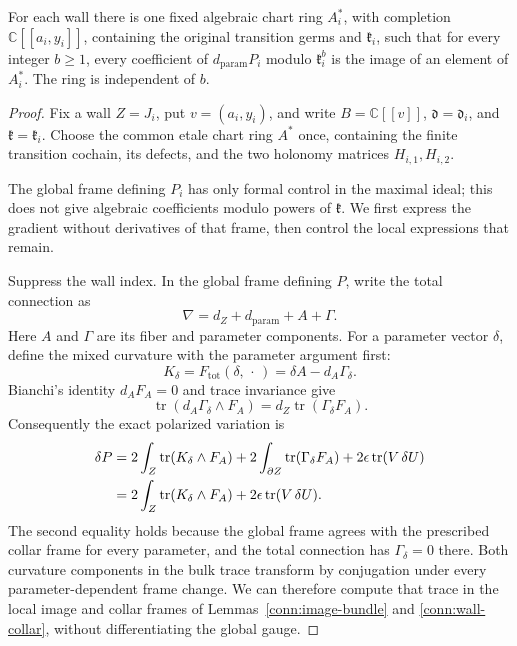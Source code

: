 \begin{proposition}
\label{conn:all-jets}
For each wall there is one fixed algebraic chart ring \(A_i^*\),
with completion \(\mathbb C[[a_i,y_i]]\), containing the original
transition germs and \(\mathfrak k_i\), such that for every
integer \(b\geq1\), every coefficient of \(d_{\mathrm{param}}P_i\)
modulo \(\mathfrak k_i^b\) is the image of an element of \(A_i^*\).
The ring is independent of \(b\).
\end{proposition}

\begin{proof}
Fix a wall \(Z=J_i\), put \(v=(a_i,y_i)\), and write
\(B=\mathbb C[[v]]\), \(\mathfrak d=\mathfrak d_i\), and
\(\mathfrak k=\mathfrak k_i\).  Choose the common etale chart
ring \(A^*\) once, containing the finite transition cochain, its
defects, and the two holonomy matrices \(H_{i,1},H_{i,2}\).

The global frame defining \(P_i\) has only formal control in the
maximal ideal; this does not give algebraic coefficients modulo
powers of \(\mathfrak k\).  We first express the gradient without
derivatives of that frame, then control the local expressions
that remain.

Suppress the wall index.  In the global frame defining \(P\), write
the total connection as
\[
 \nabla=d_Z+d_{\mathrm{param}}+A+\Gamma .
\]
Here \(A\) and \(\Gamma\) are its fiber and parameter components.
For a parameter vector \(\delta\), define the mixed curvature
with the parameter argument first:
\begin{equation}
 K_\delta=F_{\mathrm{tot}}(\delta,\,\cdot\,)
                    =\delta A-d_A\Gamma_\delta .
 \label{conn:mixed-curvature}
\end{equation}
Bianchi's identity \(d_AF_A=0\) and trace invariance give
\[
 \operatorname{tr}(d_A\Gamma_\delta\wedge F_A)
                      =d_Z\operatorname{tr}(\Gamma_\delta F_A).
\]
Consequently the exact polarized variation is
\begin{align}
 \delta P
  &=2\int_Z\operatorname{tr}(K_\delta\wedge F_A)
    +2\int_{\partial Z}\operatorname{tr}(\Gamma_\delta F_A)
    +2\epsilon\operatorname{tr}(V\,\delta U) \notag\\
  &=2\int_Z\operatorname{tr}(K_\delta\wedge F_A)
                          +2\epsilon\operatorname{tr}(V\,\delta U).
 \label{conn:controlled-gradient}
\end{align}
The second equality holds because the global frame agrees
with the prescribed collar frame for every parameter, and
the total connection has \(\Gamma_\delta=0\) there.  Both
curvature components in the bulk trace transform by
conjugation under every parameter-dependent frame change.
We can therefore compute that trace in the local image and
collar frames of Lemmas~\ref{conn:image-bundle} and
\ref{conn:wall-collar}, without differentiating the global gauge.


\end{proof}
